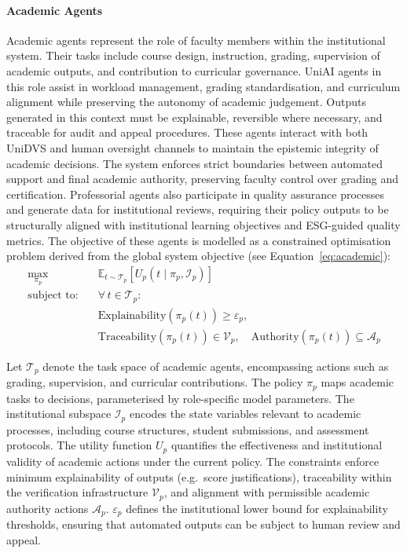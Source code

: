 \documentclass[oneside,10pt]{swissi}
\begin{document}
\paragraph{Academic Agents}

Academic agents represent the role of faculty members within the institutional system. Their tasks include course design, instruction, grading, supervision of academic outputs, and contribution to curricular governance. UniAI agents in this role assist in workload management, grading standardisation, and curriculum alignment while preserving the autonomy of academic judgement. Outputs generated in this context must be explainable, reversible where necessary, and traceable for audit and appeal procedures. These agents interact with both UniDVS and human oversight channels to maintain the epistemic integrity of academic decisions. The system enforces strict boundaries between automated support and final academic authority, preserving faculty control over grading and certification. Professorial agents also participate in quality assurance processes and generate data for institutional reviews, requiring their policy outputs to be structurally aligned with institutional learning objectives and ESG-guided quality metrics. The objective of these agents is modelled as a constrained optimisation problem derived from the global system objective (see Equation~\ref{eq:academic}):
\begin{align}
\label{eq:academic}
\max_{\pi_p} \quad & \mathbb{E}_{t \sim \mathcal{T}_p} \left[ U_p(t \mid \pi_p, \mathcal{I}_p) \right] \\
\text{subject to:} \quad
& \forall\, t \in \mathcal{T}_p: \nonumber \\
& \text{Explainability}(\pi_p(t)) \geq \varepsilon_p, \nonumber \\
& \text{Traceability}(\pi_p(t)) \in \mathcal{V}_p, \quad \text{Authority}(\pi_p(t)) \subseteq \mathcal{A}_p \nonumber
\end{align}

Let $\mathcal{T}_p$ denote the task space of academic agents, encompassing actions such as grading, supervision, and curricular contributions. The policy $\pi_p$ maps academic tasks to decisions, parameterised by role-specific model parameters. The institutional subspace $\mathcal{I}_p$ encodes the state variables relevant to academic processes, including course structures, student submissions, and assessment protocols. The utility function $U_p$ quantifies the effectiveness and institutional validity of academic actions under the current policy. The constraints enforce minimum explainability of outputs (e.g.\ score justifications), traceability within the verification infrastructure $\mathcal{V}_p$, and alignment with permissible academic authority actions $\mathcal{A}_p$. $\varepsilon_p$ defines the institutional lower bound for explainability thresholds, ensuring that automated outputs can be subject to human review and appeal.
\end{document}
